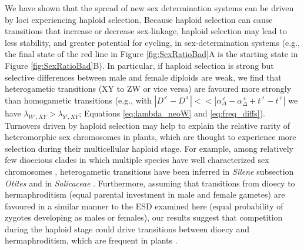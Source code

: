 \documentclass[12pt]{article}
\begin{document}
We have shown that the spread of new sex determination systems can be driven by loci experiencing haploid selection. 
Because haploid selection can cause transitions that increase or decrease sex-linkage, haploid selection may lead to less stability, and greater potential for cycling, in sex-determination systems (e.g., the final state of the red line in Figure \ref{fig:SexRatioBad}A is the starting state in Figure \ref{fig:SexRatioBad}B). 
In particular, if haploid selection is strong but selective differences between male and female diploids are weak, we find that heterogametic transitions (XY to ZW or vice versa) are favoured more strongly than homogametic transitions (e.g., with $|D^\male - D^\female| << |\alpha_\Delta^\male - \alpha_\Delta^\female + t^\male - t^\female|$ we have $\lambda_{W',XY} > \lambda_{Y',XY}$; Equations \ref{eq:lambda_neoW} and \ref{eq:freq_diffs}). 
Turnovers driven by haploid selection may help to explain the relative rarity of heteromorphic sex chromosomes in plants, which are thought to experience more selection during their multicellular haploid stage.
For example, among relatively few dioecious clades in which multiple species have well characterized sex chromosomes \citep{Ming:2011iy}, heterogametic transitions have been inferred in \textit{Silene} subsection \textit{Otites} \citep{Slancarova:2013dq} and in \textit{Salicaceae} \citep{Pucholt2015,Pucholt2017}.
Furthermore, assuming that transitions from dioecy to hermaphroditism (equal parental investment in male and female gametes) are favoured in a similar manner to the ESD examined here (equal probability of zygotes developing as males or females), our results suggest that competition during the haploid stage could drive transitions between dioecy and hermaphroditism, which are frequent in plants \citep{Kafer2017, Goldberg2017}.
\end{document}
